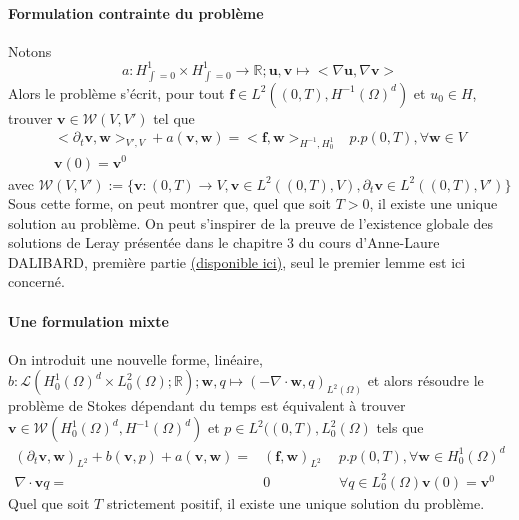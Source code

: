 \paragraph{Formulation contrainte du problème} Notons $$ a : H^1_{\int = 0} \times H^1_{\int = 0} \rightarrow \mathbb{R} ; \mathbf{u}, \mathbf{v} \mapsto < \nabla \mathbf{u}, \nabla \mathbf{v} > $$ Alors le problème s'écrit, pour tout $\mathbf{f} \in L^2\left( (0, T), H^{-1}(\Omega)^d \right)$ et $u_0 \in H$, trouver $\mathbf{v} \in \mathcal{W}(V, V')$ tel que
\begin{align*}
    <\partial_t \mathbf{v}, \mathbf{w}>_{V', V} + a(\mathbf{v}, \mathbf{w}) = <\mathbf{f}, \mathbf{w}>_{H^{-1}, H^1_0} & p.p (0, T), \forall \mathbf{w} \in V \\
    \mathbf{v}(0) = \mathbf{v}^0
\end{align*}
avec $\mathcal{W}(V, V') := \{ \mathbf{v} : (0, T) \rightarrow V, \mathbf{v} \in L^2((0,T), V), \partial_t \mathbf{v} \in L^2((0,T), V')\}$ Sous cette forme, on peut montrer que, quel que soit $T>0$, il existe une unique solution au problème. On peut s'inspirer de la preuve de l'existence globale des solutions de Leray présentée dans le chapitre 3 du cours d'Anne-Laure DALIBARD, première partie \href{https://ljll.math.upmc.fr/~dalibard/cours/Notes\%20Chapitre\%203\%20-\%20Equations\%20de\%20Navier-Stokes.pdf}{(disponible ici)}, seul le premier lemme est ici concerné.

\paragraph{Une formulation mixte} On introduit une nouvelle forme, linéaire, $b : \mathcal{L}(H^1_0(\Omega)^d \times L^2_0(\Omega) ; \mathbb{R}) ; \mathbf{w}, q \mapsto (-\nabla\cdot \mathbf{w}, q)_{L^2(\Omega)}$ et alors résoudre le problème de Stokes dépendant du temps est équivalent à trouver $\mathbf{v} \in \mathcal{W}(H^1_0(\Omega)^d, H^{-1}(\Omega)^d)$ et $p \in L^2((0,T), L^2_0(\Omega)$ tels que
\begin{align*}
    (\partial_t \mathbf{v}, \mathbf{w})_{L^2} + b(\mathbf{v}, p) + a(\mathbf{v}, \mathbf{w}) = & (\mathbf{f}, \mathbf{w})_{L^2} & \hspace{5pt} p.p (0, T), \forall \mathbf{w} \in H^1_0(\Omega)^d \\
    \nabla \cdot \mathbf{v} q = & 0 & \hspace{5pt} \forall q \in L^2_0(\Omega)
    \mathbf{v}(0) = \mathbf{v}^0
\end{align*}
Quel que soit $T$ strictement positif, il existe une unique solution du problème. 
 
